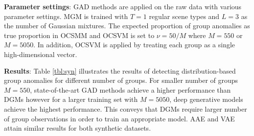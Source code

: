 

\textbf{Parameter settings}:
GAD methods are applied on the raw data with various parameter settings.
MGM is trained with $T=1$ regular scene types and $L=3$ as the number of Gaussian mixtures. The expected proportion of group anomalies as true proportion in OCSMM and OCSVM is set to  $\nu = 50/M$ where $M= 550$ or $M= 5050$. In addition, OCSVM is applied by treating each group as a single high-dimensional vector.

\textbf{Results}: Table \ref{tbl:syn} illustrates the results of detecting distribution-based group anomalies for different { number of groups}. For smaller {  number of groups} $M= 550$, state-of-the-art GAD methods achieve a higher performance  than DGMs however for a larger training set with $M= 5050$, deep generative models achieve the highest performance. This conveys that DGMs require larger {  number of group} observations in order to train an appropriate model. { AAE and VAE attain similar results for both synthetic datasets.}

\begin{table*}
    \centering
       \vspace{2mm}
        \caption{Results for detecting rotated Gaussian distributions in synthetic datasets where %
        AAE and VAE attain poor detection results for smaller datasets while they achieve highest performances (as highlighted in gray) for a larger number of groups.  }
    \label{tbl:syn}
\end{table*}

